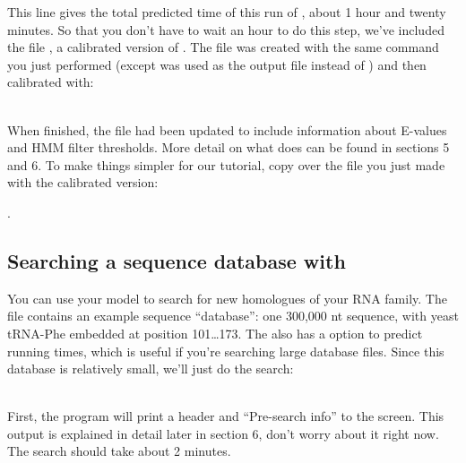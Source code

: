 This line gives the total predicted time of this run of
, about 1 hour and twenty minutes. So that you
don't have to wait an hour to do this step, we've included the file
, a calibrated version of . The
 file was created with the same  command
you just performed (except  was used as the output file
instead of ) and then calibrated with:

\\

When  finished, the  file had
been updated to include information about E-values and HMM filter
thresholds. More detail on what  does can be found
in sections 5 and 6. To make things simpler for our tutorial, copy over
the  file you just made with the calibrated version:
 
.\\

\subsection{Searching a sequence database with }

You can use your model to search for new homologues of your RNA
family. The file  contains an example sequence
``database'': one 300,000 nt sequence, with yeast tRNA-Phe embedded at
position 101\ldots173. The  also has a
 option to predict running times, which is useful if
you're searching large database files. Since this database is
relatively small, we'll just do the search:

\\

First, the program will print a header and ``Pre-search info'' to the
screen. This output is explained in detail later in section 6, don't
worry about it right now. The search should take about 2 minutes.

